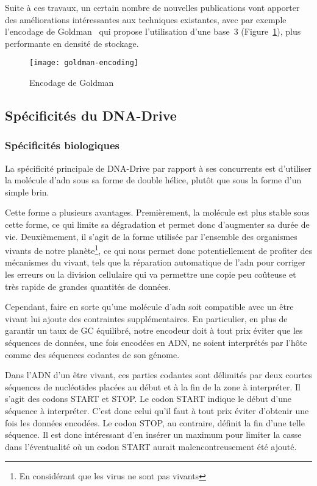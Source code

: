 \documentclass[a4paper]{report}
\begin{document}
Suite à ces travaux, un certain nombre de nouvelles publications vont apporter des améliorations intéressantes aux techniques existantes,
avec par exemple l'encodage de Goldman~\cite{goldman2013towards} qui propose l'utilisation d'une base~3 (Figure~\ref{fig:goldman-encoding}),
plus performante en densité de stockage.

\begin{figure}[ht]
\centering
\texttt{[image: goldman-encoding]}
\caption{Encodage de Goldman~\cite{goldman2013towards}}
\label{fig:goldman-encoding}
\end{figure}


\subsection{Spécificités du DNA-Drive}

\subsubsection{Spécificités biologiques}

La spécificité principale de DNA-Drive par rapport à ses concurrents est d'utiliser la molécule d'\ac{adn} sous sa forme de double hélice, plutôt que sous la forme d'un simple brin.

Cette forme a plusieurs avantages.
Premièrement, la molécule est plus stable sous cette forme, ce qui limite sa dégradation et permet donc d'augmenter sa durée de vie.
Deuxièmement, il s'agit de la forme utilisée par l'ensemble des organismes vivants de notre planète\footnote{En considérant que les virus ne sont pas vivants},
ce qui nous permet donc potentiellement de profiter des mécanismes du vivant,
tels que la réparation automatique de l’\ac{adn} pour corriger les erreurs
ou la division cellulaire qui va permettre une copie peu coûteuse et très rapide de grandes quantités de données.

Cependant, faire en sorte qu'une molécule d'\ac{adn} soit compatible avec un être vivant lui ajoute des contraintes supplémentaires.
En particulier, en plus de garantir un taux de GC équilibré,
notre encodeur doit à tout prix éviter que les séquences de données, une fois encodées en ADN,
ne soient interprétés par l'hôte comme des séquences codantes de son génome.

Dans l'ADN d'un être vivant, ces parties codantes sont délimités par deux courtes séquences de nucléotides placées au début et à la fin de la zone à interpréter.
Il s'agit des codons START et STOP.
Le codon START indique le début d'une séquence à interpréter.
C'est donc celui qu'il faut à tout prix éviter d'obtenir une fois les données encodées.
Le codon STOP, au contraire, définit la fin d'une telle séquence.
Il est donc intéressant d'en insérer un maximum pour limiter la casse dans l'éventualité où un codon START aurait malencontreusement été ajouté.
\end{document}
